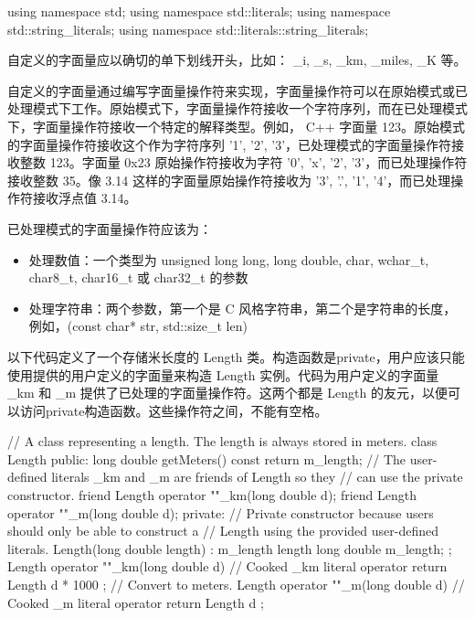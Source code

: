 \begin{cpp}
using namespace std;
using namespace std::literals;
using namespace std::string_literals;
using namespace std::literals::string_literals;
\end{cpp}



自定义的字面量应以确切的单下划线开头，比如： \_i, \_s, \_km, \_miles, \_K 等。

自定义的字面量通过编写字面量操作符来实现，字面量操作符可以在原始模式或已处理模式下工作。原始模式下，字面量操作符接收一个字符序列，而在已处理模式下，字面量操作符接收一个特定的解释类型。例如， C++ 字面量 123。原始模式的字面量操作符接收这个作为字符序列 '1', '2', '3'，已处理模式的字面量操作符接收整数 123。字面量 0x23 原始操作符接收为字符 '0', 'x', '2', '3'，而已处理操作符接收整数 35。像 3.14 这样的字面量原始操作符接收为 '3', '.', '1', '4'，而已处理操作符接收浮点值 3.14。


已处理模式的字面量操作符应该为：

\begin{itemize}
\item
处理数值：一个类型为 unsigned long long, long double, char, wchar\_t, char8\_t, char16\_t 或 char32\_t 的参数

\item
处理字符串：两个参数，第一个是 C 风格字符串，第二个是字符串的长度，例如，(const char* str, std::size\_t len)
\end{itemize}

以下代码定义了一个存储米长度的 Length 类。构造函数是private，用户应该只能使用提供的用户定义的字面量来构造 Length 实例。代码为用户定义的字面量 \_km 和 \_m 提供了已处理的字面量操作符。这两个都是 Length 的友元，以便可以访问private构造函数。这些操作符之间，不能有空格。

\begin{cpp}
// A class representing a length. The length is always stored in meters.
class Length
{
    public:
        long double getMeters() const { return m_length; }
        // The user-defined literals _km and _m are friends of Length so they
        // can use the private constructor.
        friend Length operator ""_km(long double d);
        friend Length operator ""_m(long double d);
    private:
        // Private constructor because users should only be able to construct a
        // Length using the provided user-defined literals.
        Length(long double length) : m_length { length } {}
        long double m_length;
};
Length operator ""_km(long double d) // Cooked _km literal operator
{
    return Length { d * 1000 }; // Convert to meters.
}
Length operator ""_m(long double d) // Cooked _m literal operator
{
    return Length { d };
}
\end{cpp}

